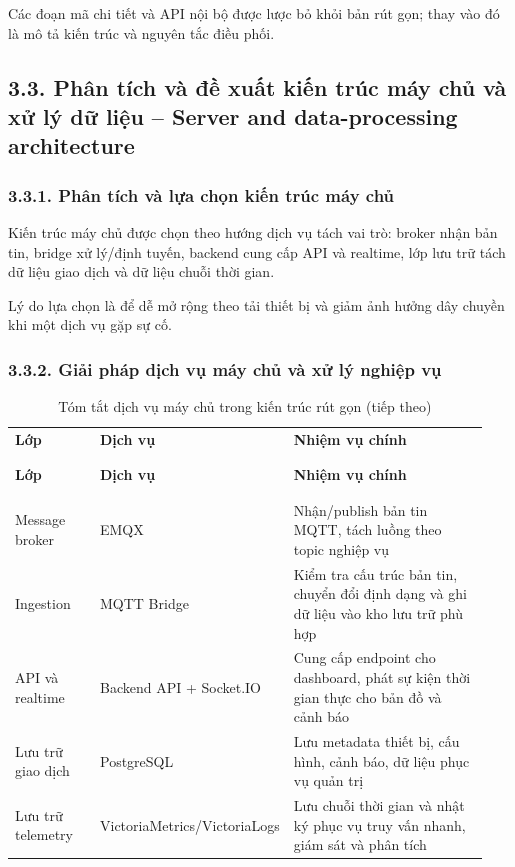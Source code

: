 \documentclass[a4paper]{extarticle}
\newcommand{\thesissettableid}[2]{%
  \renewcommand{\thetable}{#1}%
  \renewcommand{\theHtable}{#2}%
}
\begin{document}
Các đoạn mã chi tiết và API nội bộ được lược bỏ khỏi bản rút gọn; thay vào đó là mô tả kiến trúc và nguyên tắc điều phối.

\subsection{3.3. Phân tích và đề xuất kiến trúc máy chủ và xử lý dữ liệu -- Server and data-processing architecture}

\subsubsection{3.3.1. Phân tích và lựa chọn kiến trúc máy chủ}

Kiến trúc máy chủ được chọn theo hướng dịch vụ tách vai trò: broker nhận bản tin, bridge xử lý/định tuyến, backend cung cấp API và realtime, lớp lưu trữ tách dữ liệu giao dịch và dữ liệu chuỗi thời gian.

Lý do lựa chọn là để dễ mở rộng theo tải thiết bị và giảm ảnh hưởng dây chuyền khi một dịch vụ gặp sự cố.

\subsubsection{3.3.2. Giải pháp dịch vụ máy chủ và xử lý nghiệp vụ}

{\thesissettableid{3.3}{tab-condensed-ch3-cloud-services}
\def\LTcaptype{table}
\begin{longtable}{|L{0.190\linewidth}|L{0.260\linewidth}|L{0.490\linewidth}|}
\caption{Tóm tắt dịch vụ máy chủ trong kiến trúc rút gọn}\label{tab:condensed-ch3-cloud-services}\\
\hline \textbf{Lớp} & \textbf{Dịch vụ} & \textbf{Nhiệm vụ chính} \\
\\\hline
\endfirsthead
\caption[]{Tóm tắt dịch vụ máy chủ trong kiến trúc rút gọn (tiếp theo)}\\
\hline \textbf{Lớp} & \textbf{Dịch vụ} & \textbf{Nhiệm vụ chính} \\
\\\hline
\endhead
\\\hline
\endfoot
\endlastfoot
Message broker & EMQX & Nhận/publish bản tin MQTT, tách luồng theo topic nghiệp vụ \\\hline
Ingestion & MQTT Bridge & Kiểm tra cấu trúc bản tin, chuyển đổi định dạng và ghi dữ liệu vào kho lưu trữ phù hợp \\\hline
API và realtime & Backend API + Socket.IO & Cung cấp endpoint cho dashboard, phát sự kiện thời gian thực cho bản đồ và cảnh báo \\\hline
Lưu trữ giao dịch & PostgreSQL & Lưu metadata thiết bị, cấu hình, cảnh báo, dữ liệu phục vụ quản trị \\\hline
Lưu trữ telemetry & VictoriaMetrics/VictoriaLogs & Lưu chuỗi thời gian và nhật ký phục vụ truy vấn nhanh, giám sát và phân tích \\\hline
\end{longtable}
}
\end{document}
